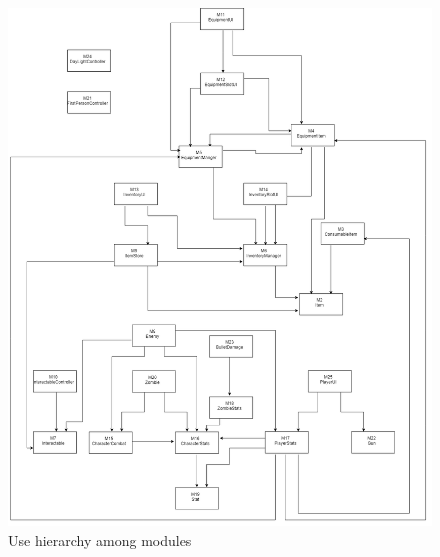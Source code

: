 \documentclass[12pt, titlepage]{article}
\begin{document}
\begin{figure}[H]
\centering
\includegraphics[scale=0.3]{UsesHierarchy.png}
\caption{Use hierarchy among modules}
\label{FigUH}
\end{figure}
\end{document}
